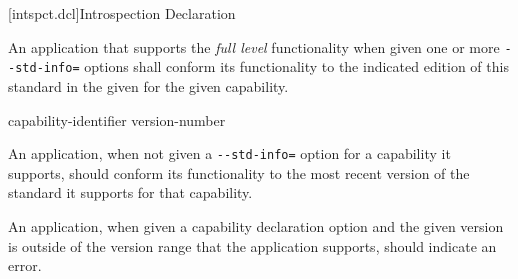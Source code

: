 [intspct.dcl]{Introspection Declaration}

\pnum
An application that supports the \emph{full level} functionality when given one
or more \verb|--std-info=| options shall conform its
functionality to the indicated edition of this standard in the given
  for the given capability.

\begin{ncbnf}

\br
	capability-identifier   version-number

\end{ncbnf}

\pnum
An application, when not given a \verb|--std-info=|
option for a capability it supports, should conform its functionality to the
most recent version of the standard it supports for that capability.

\pnum
An application, when given a capability declaration option and the given
version is outside of the version range that the application supports, should
indicate an error.
